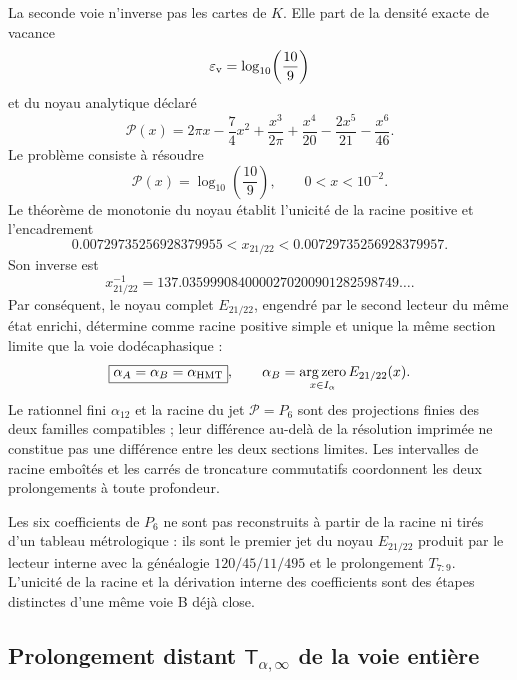La seconde voie n’inverse pas les cartes de \(K\). Elle part de la densité exacte
de vacance
\[
 \varepsilon_{\rm v}=\log_{10}\!\left(\frac{10}{9}\right)
\]
et du noyau analytique déclaré
\begin{equation}
 \mathcal P(x)
 =2\pi x-\frac74x^2+\frac{x^3}{2\pi}
  +\frac{x^4}{20}-\frac{2x^5}{21}-\frac{x^6}{46}.
 \label{eq:alpha-rev8-kernel-e21-22}
\end{equation}
Le problème consiste à résoudre
\begin{equation}
 \mathcal P(x)=\log_{10}\!\left(\frac{10}{9}\right),
 \qquad 0<x<10^{-2}.
 \label{eq:alpha-rev8-ecuacion-e21-22}
\end{equation}
Le théorème de monotonie du noyau établit l’unicité de la racine positive
et l’encadrement
\[
 0.00729735256928379955
 <x_{21/22}<
 0.00729735256928379957.
\]
Son inverse est
\begin{equation}
 x_{21/22}^{-1}
 =137.0359990840000270200901282598749\ldots.
 \label{eq:alpha-rev8-inversa-e21-22}
\end{equation}
Par conséquent, le noyau complet \(E_{21/22}\), engendré par le second
lecteur du même état enrichi, détermine comme racine positive simple et
unique la même section limite que la voie dodécaphasique :
\[
 \boxed{\alpha_A=\alpha_B=\alpha_{\rm HMT}},
 \qquad
 \alpha_B=\operatorname*{arg\,zero}_{x\in I_\alpha}E_{21/22}(x).
\]
Le rationnel fini \(\alpha_{12}\) et la racine du jet \(\mathcal P=P_6\)
sont des projections finies des deux familles compatibles ; leur différence au-delà
de la résolution imprimée ne constitue pas une différence entre les deux
sections limites. Les intervalles de racine emboîtés et les carrés de
troncature commutatifs coordonnent les deux prolongements à toute profondeur.

Les six coefficients de \(P_6\) ne sont pas reconstruits à partir de la racine ni tirés
d’un tableau métrologique : ils sont le premier jet du noyau \(E_{21/22}\) produit
par le lecteur interne avec la généalogie \(120/45/11/495\) et le prolongement
\(T_{7:9}\). L’unicité de la racine et la dérivation interne des
coefficients sont des étapes distinctes d’une même voie B déjà close.

\subsection{Prolongement distant \texorpdfstring{\(\mathsf T_{\alpha,\infty}\)}{T alpha infini} de la voie entière}


